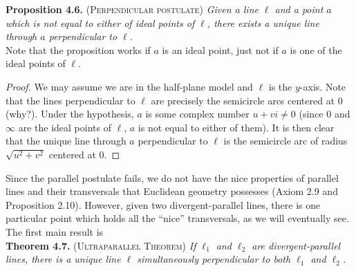 \documentclass[leqno]{book}
\begin{document}
\noindent\textbf{Proposition 4.6.} \textsc{(Perpendicular postulate)} \emph{Given a line $\ell$ and a point $a$ which is not equal to either of ideal points of $\ell$, there exists a unique line through $a$ perpendicular to $\ell$.}\\

\noindent Note that the proposition works if $a$ is an ideal point, just not if $a$ is one of the ideal points of $\ell$.
\begin{proof}
We may assume we are in the half-plane model and $\ell$ is the $y$-axis.  Note that the lines perpendicular to $\ell$ are precisely the semicircle arcs centered at $0$ (why?).  Under the hypothesis, $a$ is some complex number $u+vi\ne 0$ (since $0$ and $\infty$ are the ideal points of $\ell$, $a$ is not equal to either of them).  It is then clear that the unique line through $a$ perpendicular to $\ell$ is the semicircle arc of radius $\sqrt{u^2+v^2}$ centered at $0$.
\end{proof}

\noindent Since the parallel postulate fails, we do not have the nice properties of parallel lines and their transversals that Euclidean geometry possesses (Axiom 2.9 and Proposition 2.10).  However, given two divergent-parallel lines, there is one particular point which holds all the ``nice'' transversals, as we will eventually see.  The first main result is\\

\noindent\textbf{Theorem 4.7.} \textsc{(Ultraparallel Theorem)} \emph{If $\ell_1$ and $\ell_2$ are divergent-parallel lines, there is a unique line $\ell$ simultaneously perpendicular to both $\ell_1$ and $\ell_2$.}\\
\end{document}
